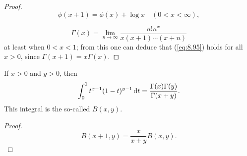 \begin{proof}
    \begin{equation}
        \label{eq:8.94}
        \phi(x+1) = \phi(x) + \log x
        \quad
        (0 < x < \infty),
    \end{equation}

    \begin{equation}
        \label{eq:8.95}
        \Gamma(x) =
        \lim_{n \to \infty} \frac{n!n^x}{x(x+1)\cdots(x+n)}
    \end{equation}
    at least when $0 < x < 1$;
    from this one can deduce that (\ref{eq:8.95}) holds for all $x > 0$,
    since $\Gamma(x+1)=x\Gamma(x)$.
\end{proof}

\begin{thm}
    \label{thm:8.20}
    If $x>0$ and $y>0$, then
    \begin{equation}
        \label{eq:8.96}
        \int_{0}^{1} t^{x-1}(1-t)^{y-1} \d t =
        \frac{\Gamma(x)\Gamma(y)}{\Gamma(x+y)}.
    \end{equation}
    This integral is the so-called  $B(x, y)$.
\end{thm}


\begin{proof}
    \begin{equation}
        \label{eq:8.97}
        B(x+1,y) = \frac{x}{x+y}B(x,y) .
    \end{equation}
\end{proof}


